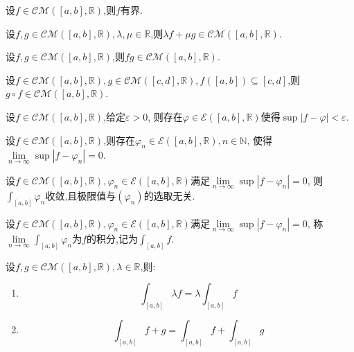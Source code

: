 \begin{prop}
    设$f\in\mathcal{CM}([a,b],\mathbb{R})$,则$f$有界.
\end{prop}

\begin{prop}
    设$f,g\in\mathcal{CM}([a,b],\mathbb{R}),\lambda,\mu\in\mathbb{R}$,则$\lambda f+\mu g\in\mathcal{CM}([a,b],\mathbb{R})$.
\end{prop}

\begin{prop}
    设$f,g\in\mathcal{CM}([a,b],\mathbb{R})$,则$fg\in\mathcal{CM}([a,b],\mathbb{R})$.
\end{prop}

\begin{prop}
    设$f\in\mathcal{CM}([a,b],\mathbb{R}),g\in\mathcal{CM}([c,d],\mathbb{R}),f([a,b])\subseteq[c,d]$,则$g\circ f\in\mathcal{CM}([a,b],\mathbb{R})$.
\end{prop}

\begin{lem}
    设$f\in\mathcal{CM}([a,b],\mathbb{R})$,给定$\varepsilon>0$,
    则存在$\varphi\in\mathcal{E}([a,b],\mathbb{R})$使得$\sup\left\lvert f-\varphi \right\rvert < \varepsilon$.
\end{lem}

\begin{prop}
    设$f\in\mathcal{CM}([a,b],\mathbb{R})$,则存在$\varphi_n\in\mathcal{E}([a,b],\mathbb{R}),n\in\mathbb{N}$,
    使得$\lim\limits_{n\to\infty}\sup\left\lvert f-\varphi_n \right\rvert = 0$.
\end{prop}

\begin{thm}
    设$f\in\mathcal{CM}([a,b],\mathbb{R}),\varphi_n\in\mathcal{E}([a,b],\mathbb{R})$满足$\lim\limits_{n\to\infty}\sup\left\lvert f-\varphi_n \right\rvert = 0$,
    则$\int_{[a,b]}\varphi_n$收敛,且极限值与$(\varphi_n)$的选取无关.
\end{thm}

\begin{deff}
    设$f\in\mathcal{CM}([a,b],\mathbb{R}),\varphi_n\in\mathcal{E}([a,b],\mathbb{R})$满足$\lim\limits_{n\to\infty}\sup\left\lvert f-\varphi_n \right\rvert = 0$,
    称$\lim\limits_{n\to\infty}\int_{[a,b]}\varphi_n$为$f$的积分,记为$\int_{[a,b]}f$.
\end{deff}

\begin{prop}
    设$f,g\in\mathcal{CM}([a,b],\mathbb{R}),\lambda\in\mathbb{R}$,则:
    \begin{enumerate}
        \item \[ \int_{[a,b]}\lambda f=\lambda\int_{[a,b]}f \]
        \item \[ \int_{[a,b]}f+g=\int_{[a,b]}f+\int_{[a,b]}g \]
    \end{enumerate}
\end{prop}

